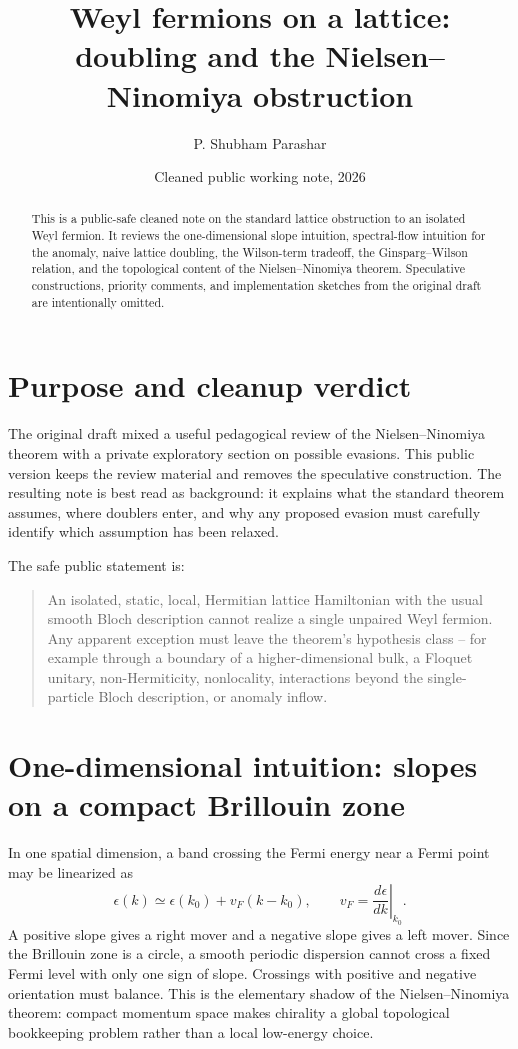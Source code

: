 \documentclass[11pt]{article}
\title{Weyl fermions on a lattice:\\ doubling and the Nielsen--Ninomiya obstruction}
\author{P. Shubham Parashar}
\date{Cleaned public working note, 2026}
\begin{document}
\maketitle

\begin{abstract}
This is a public-safe cleaned note on the standard lattice obstruction to an isolated Weyl fermion.  It reviews the one-dimensional slope intuition, spectral-flow intuition for the anomaly, naive lattice doubling, the Wilson-term tradeoff, the Ginsparg--Wilson relation, and the topological content of the Nielsen--Ninomiya theorem. Speculative constructions, priority comments, and implementation sketches from the original draft are intentionally omitted.
\end{abstract}

\section{Purpose and cleanup verdict}
The original draft mixed a useful pedagogical review of the Nielsen--Ninomiya theorem with a private exploratory section on possible evasions. This public version keeps the review material and removes the speculative construction. The resulting note is best read as background: it explains what the standard theorem assumes, where doublers enter, and why any proposed evasion must carefully identify which assumption has been relaxed.

The safe public statement is:
\begin{quote}
An isolated, static, local, Hermitian lattice Hamiltonian with the usual smooth Bloch description cannot realize a single unpaired Weyl fermion. Any apparent exception must leave the theorem's hypothesis class -- for example through a boundary of a higher-dimensional bulk, a Floquet unitary, non-Hermiticity, nonlocality, interactions beyond the single-particle Bloch description, or anomaly inflow.
\end{quote}

\section{One-dimensional intuition: slopes on a compact Brillouin zone}
In one spatial dimension, a band crossing the Fermi energy near a Fermi point may be linearized as
\begin{equation}
  \epsilon(k) \simeq \epsilon(k_0)+v_F(k-k_0),\qquad
  v_F=\left.\frac{d\epsilon}{dk}\right|_{k_0}.
\end{equation}
A positive slope gives a right mover and a negative slope gives a left mover. Since the Brillouin zone is a circle, a smooth periodic dispersion cannot cross a fixed Fermi level with only one sign of slope. Crossings with positive and negative orientation must balance. This is the elementary shadow of the Nielsen--Ninomiya theorem: compact momentum space makes chirality a global topological bookkeeping problem rather than a local low-energy choice.
\end{document}
